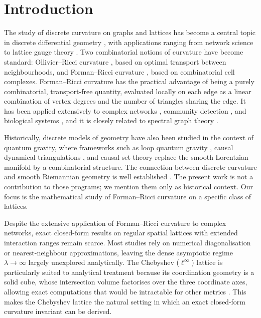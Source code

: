 \documentclass[aps,pre,onecolumn,10pt,groupedaddress,amsmath,amssymb,floatfix]{revtex4-2}
\begin{document}
\section{Introduction}
\label{sec:intro}

The study of discrete curvature on graphs and lattices has become a central topic in discrete differential geometry \cite{chung1997spectral, chapman2013curvature, jost2014ollivier, bridson1999metric}, with applications ranging from network science \cite{weber2017forman, samal2018comparative, albert2002statistical} to lattice gauge theory \cite{kogut1979introduction, wilson1974confinement, goldenfeld1992lectures}. Two combinatorial notions of curvature have become standard: Ollivier--Ricci curvature \cite{ollivier2009ricci}, based on optimal transport between neighbourhoods, and Forman--Ricci curvature \cite{forman2003bochner}, based on combinatorial cell complexes. Forman--Ricci curvature has the practical advantage of being a purely combinatorial, transport-free quantity, evaluated locally on each edge as a linear combination of vertex degrees and the number of triangles sharing the edge. It has been applied extensively to complex networks \cite{sreejith2016forman}, community detection \cite{sandhu2016ricci}, and biological systems \cite{gosztolai2021unfolding}, and it is closely related to spectral graph theory \cite{chung1997spectral}.

Historically, discrete models of geometry have also been studied in the context of quantum gravity, where frameworks such as loop quantum gravity \cite{ashtekar2004background}, causal dynamical triangulations \cite{ambjorn2012nonperturbative}, and causal set theory \cite{surya2019causal} replace the smooth Lorentzian manifold by a combinatorial structure. The connection between discrete curvature and smooth Riemannian geometry is well established \cite{misner1973gravitation, hamilton1982three, docarmo1992riemannian}. The present work is not a contribution to those programs; we mention them only as historical context. Our focus is the mathematical study of Forman--Ricci curvature on a specific class of lattices.

Despite the extensive application of Forman--Ricci curvature to complex networks, exact closed-form results on regular spatial lattices with extended interaction ranges remain scarce. Most studies rely on numerical diagonalisation or nearest-neighbour approximations, leaving the dense asymptotic regime $\lambda \to \infty$ largely unexplored analytically. The Chebyshev ($\ell^\infty$) lattice is particularly suited to analytical treatment because its coordination geometry is a solid cube, whose intersection volume factorises over the three coordinate axes, allowing exact computations that would be intractable for other metrics \cite{conway1999sphere, thompson1996minkowski}. This makes the Chebyshev lattice the natural setting in which an exact closed-form curvature invariant can be derived.
\end{document}
